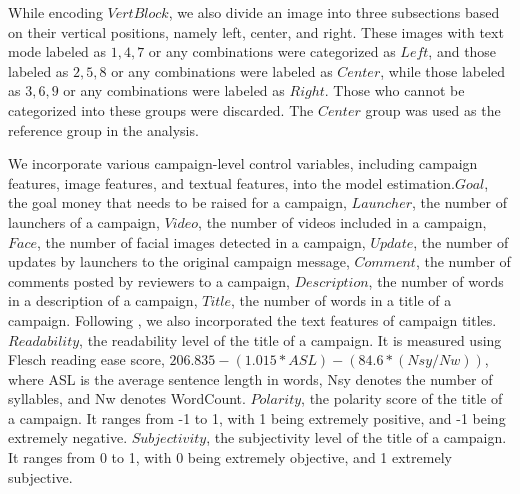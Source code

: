 \documentclass[a4paper]{article}
\begin{document}
While encoding $VertBlock$, we also divide an image into three subsections based on their vertical positions, namely left, center, and right. These images with text mode labeled as $1,4,7$ or any combinations were categorized as $Left$, and those labeled as $2,5,8$ or any combinations were labeled as $Center$, while those labeled as $3,6,9$ or any combinations were labeled as $Right$. Those who cannot be categorized into these groups were discarded. The $Center$ group was used as the reference group in the analysis. 

We incorporate various campaign-level control variables, including campaign features, image features, and textual features, into the model estimation.$Goal$, the goal money that needs to be raised for a campaign, $Launcher$, the number of launchers of a campaign, $Video$, the number of videos included in a campaign, $Face$, the number of facial images detected in a campaign, $Update$, the number of updates by launchers to the original campaign message, $Comment$, the number of comments posted by reviewers to a campaign, $Description$, the number of words in a description of a campaign, $Title$, the number of words in a title of a campaign. Following \parencite{zhao_multi-modal_2022}, we also incorporated the text features of campaign titles. $Readability$, the readability level of the title of a campaign. It is measured using Flesch reading ease score, $206.835 - (1.015 * ASL) - (84.6 * (Nsy / Nw))$, where ASL is the average sentence length in words, Nsy denotes the number of syllables, and Nw denotes WordCount. $Polarity$, the polarity score of the title of a campaign. It ranges from -1 to 1, with 1 being extremely positive, and -1 being extremely negative. $Subjectivity$, the subjectivity level of the title of a campaign. It ranges from 0 to 1, with 0 being extremely objective, and 1 extremely subjective. 
\end{document}
